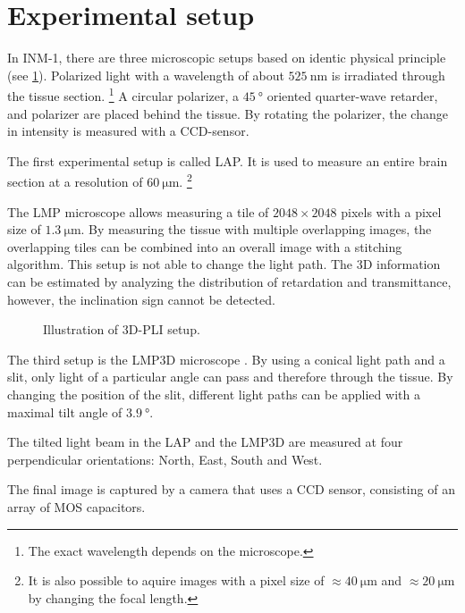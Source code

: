 \section{Experimental setup}\label{sec:expSetup}
%
In \ac{INM-1}, there are three microscopic setups based on identic physical principle \cite{Axer2011} (see \cref{fig:pli_setup}).
Polarized light with a wavelength of about $\SI{525}{\nano\meter}$ is irradiated through the tissue section. \footnote{The exact wavelength depends on the microscope.}
A circular polarizer, a $\SI{45}{\degree}$ oriented quarter-wave retarder, and polarizer are placed behind the tissue.
By rotating the polarizer, the change in intensity is measured with a \ac{CCD}-sensor.
\par
% 
The first experimental setup is called \ac{LAP}.
It is used to measure an entire brain section at a resolution of $\SI{60}{\micro\meter}$. \footnote{It is also possible to aquire images with a pixel size of $\approx \SI{40}{\micro\meter}$ and $\approx \SI{20}{\micro\meter}$ by changing the focal length.}
\par
% 
The \ac{LMP} microscope allows measuring a tile of $\num{2048}\times\num{2048}$ pixels with a pixel size of $\SI{1.3}{\micro\meter}$.
By measuring the tissue with multiple overlapping images, the overlapping tiles can be combined into an overall image with a stitching algorithm. 
This setup is not able to change the light path.
The 3D information can be estimated by analyzing the distribution of retardation and transmittance, however, the inclination sign cannot be detected.
\par
% 
\begin{figure}[!t]
    \captionsetup[sub]{position=top}
    \setlength{\tikzwidth}{\textwidth}
	\centering
	\caption{Illustration of \acs{3D-PLI} setup.}
	\label{fig:pli_setup}
\end{figure}
% 
The third setup is the \ac{LMP3D} microscope \cite{Wiese:887678}.
By using a conical light path and a slit, only light of a particular angle can pass and therefore through the tissue.
By changing the position of the slit, different light paths can be applied with a maximal tilt angle of $\SI{3.9}{\degree}$.
\par
% 
The tilted light beam in the \acs{LAP} and the \acs{LMP3D} are measured at four perpendicular orientations: North, East, South and West.
\par
%
The final image is captured by a camera that uses a \ac{CCD} sensor, consisting of an array of \ac{MOS} capacitors.
